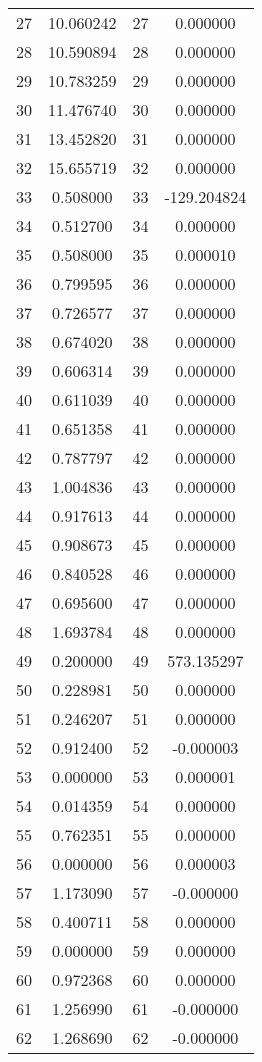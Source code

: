 \documentclass[12pt]{article}
\begin{document}
\begin{longtable}{@{}cccc@{}}
27 & 10.060242 & 27 & 0.000000 \\
28 & 10.590894 & 28 & 0.000000 \\
29 & 10.783259 & 29 & 0.000000 \\
30 & 11.476740 & 30 & 0.000000 \\
31 & 13.452820 & 31 & 0.000000 \\
32 & 15.655719 & 32 & 0.000000 \\
33 & 0.508000 & 33 & -129.204824 \\
34 & 0.512700 & 34 & 0.000000 \\
35 & 0.508000 & 35 & 0.000010 \\
36 & 0.799595 & 36 & 0.000000 \\
37 & 0.726577 & 37 & 0.000000 \\
38 & 0.674020 & 38 & 0.000000 \\
39 & 0.606314 & 39 & 0.000000 \\
40 & 0.611039 & 40 & 0.000000 \\
41 & 0.651358 & 41 & 0.000000 \\
42 & 0.787797 & 42 & 0.000000 \\
43 & 1.004836 & 43 & 0.000000 \\
44 & 0.917613 & 44 & 0.000000 \\
45 & 0.908673 & 45 & 0.000000 \\
46 & 0.840528 & 46 & 0.000000 \\
47 & 0.695600 & 47 & 0.000000 \\
48 & 1.693784 & 48 & 0.000000 \\
49 & 0.200000 & 49 & 573.135297 \\
50 & 0.228981 & 50 & 0.000000 \\
51 & 0.246207 & 51 & 0.000000 \\
52 & 0.912400 & 52 & -0.000003 \\
53 & 0.000000 & 53 & 0.000001 \\
54 & 0.014359 & 54 & 0.000000 \\
55 & 0.762351 & 55 & 0.000000 \\
56 & 0.000000 & 56 & 0.000003 \\
57 & 1.173090 & 57 & -0.000000 \\
58 & 0.400711 & 58 & 0.000000 \\
59 & 0.000000 & 59 & 0.000000 \\
60 & 0.972368 & 60 & 0.000000 \\
61 & 1.256990 & 61 & -0.000000 \\
62 & 1.268690 & 62 & -0.000000 \\

\end{longtable}
\end{document}
